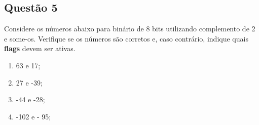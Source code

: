 \documentclass{article}
\begin{document}
\newpage

        \subsection{Questão 5}
            \begin{exercise}
                Considere os números abaixo para binário de 8 bits utilizando complemento de 2 e some-os. Verifique se os números são corretos e, caso contrário, indique quais \textbf{flags} devem ser ativas.
                \begin{enumerate}[noitemsep]
                    \item 63 e 17;
                    \item 27 e -39;
                    \item -44 e -28;
                    \item -102 e - 95;
                \end{enumerate}
            \end{exercise}
\end{document}

